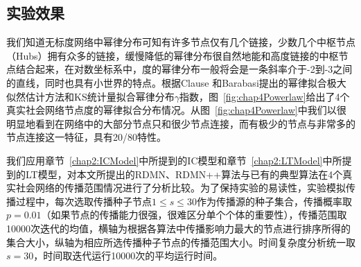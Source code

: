 \subsection{实验效果}
我们知道无标度网络中幂律分布可知有许多节点仅有几个链接，少数几个中枢节点（Hubs）拥有众多的链接，缓慢降低的幂律分布很自然地能和高度链接的中枢节点结合起来，在对数坐标系中，度的幂律分布一般将会是一条斜率介于-2到-3之间的直线，同时也具有小世界的特点。根据Clause\cite{clauset2009power} 和Barabasi\cite{albert1999internet}提出的幂律拟合极大似然估计方法和KS统计量拟合幂律分布$\gamma$指数，图~\ref{fig:chap4Powerlaw}给出了4个真实社会网络节点度的幂律拟合分布情况。从图~\ref{fig:chap4Powerlaw}中我们以很明显地看到在网络中的大部分节点只和很少节点连接，而有极少的节点与非常多的节点连接这一特征，具有20/80特性\cite{sen1970impossibility,chang2000liberal,newman2005power}。

我们应用章节~\ref{chap2:ICModel}中所提到的IC模型和章节~\ref{chap2:LTModel}中所提到的LT模型，对本文所提出的RDMN、RDMN++算法与已有的典型算法在4个真实社会网络的传播范围情况进行了分析比较。为了保持实验的易读性，实验模拟传播过程中，每次选取传播种子节点$1\leq s\leq 30$作为传播源的种子集合，传播概率取$p=0.01$（如果节点的传播能力很强，很难区分单个个体的重要性），传播范围取10000次迭代的均值，横轴为根据各算法中传播影响力最大的节点进行排序所得的集合大小，纵轴为相应所选传播种子节点的传播范围大小。时间复杂度分析统一取$s=30$，时间取迭代运行10000次的平均运行时间。

